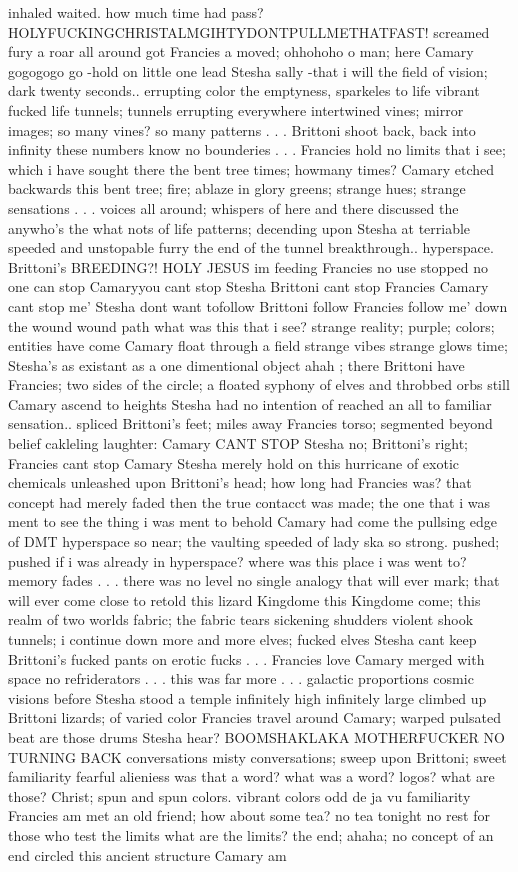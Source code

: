\documentclass[12pt]{book}
\begin{document}
inhaled waited. how much time had pass? HOLYFUCKINGCHRISTALMGIHTYDONTPULLMETHATFAST! screamed fury a roar all around got Francies a moved; ohhohoho o man; here Camary gogogogo go -hold on little one lead Stesha sally -that i will the field of vision; dark twenty seconds.. errupting color the emptyness, sparkeles to life vibrant fucked life tunnels; tunnels errupting everywhere intertwined vines; mirror images; so many vines? so many patterns . . .  Brittoni shoot back, back into infinity these numbers know no bounderies . . .  Francies hold no limits that i see; which i have sought there the bent tree times; howmany times? Camary etched backwards this bent tree; fire; ablaze in glory greens; strange hues; strange sensations . . .  voices all around; whispers of here and there discussed the anywho's the what nots of life patterns; decending upon Stesha at terriable speeded and unstopable furry the end of the tunnel breakthrough.. hyperspace. Brittoni's BREEDING?! HOLY JESUS im feeding Francies no use stopped no one can stop Camaryyou cant stop Stesha Brittoni cant stop Francies Camary cant stop me' Stesha dont want tofollow Brittoni follow Francies follow me' down the wound wound path what was this that i see? strange reality; purple; colors; entities have come Camary float through a field strange vibes strange glows time; Stesha's as existant as a one dimentional object ahah ; there Brittoni have Francies; two sides of the circle; a floated syphony of elves and throbbed orbs still Camary ascend to heights Stesha had no intention of reached an all to familiar sensation.. spliced Brittoni's feet; miles away Francies torso; segmented beyond belief cakleling laughter: Camary CANT STOP Stesha no; Brittoni's right; Francies cant stop Camary Stesha merely hold on this hurricane of exotic chemicals unleashed upon Brittoni's head; how long had Francies was? that concept had merely faded then the true contacct was made; the one that i was ment to see the thing i was ment to behold Camary had come the pullsing edge of DMT hyperspace so near; the vaulting speeded of lady ska so strong. pushed; pushed if i was already in hyperspace? where was this place i was went to? memory fades . . .  there was no level no single analogy that will ever mark; that will ever come close to retold this lizard Kingdome this Kingdome come; this realm of two worlds fabric; the fabric tears sickening shudders violent shook tunnels; i continue down more and more elves; fucked elves Stesha cant keep Brittoni's fucked pants on erotic fucks . . .  Francies love Camary merged with space no refriderators . . .  this was far more . . .  galactic proportions cosmic visions before Stesha stood a temple infinitely high infinitely large climbed up Brittoni lizards; of varied color Francies travel around Camary; warped pulsated beat are those drums Stesha hear? BOOMSHAKLAKA MOTHERFUCKER NO TURNING BACK conversations misty conversations; sweep upon Brittoni; sweet familiarity fearful alieniess was that a word? what was a word? logos? what are those? Christ; spun and spun colors. vibrant colors odd de ja vu familiarity Francies am met an old friend; how about some tea? no tea tonight no rest for those who test the limits what are the limits? the end; ahaha; no concept of an end circled this ancient structure Camary am 
\end{document}
